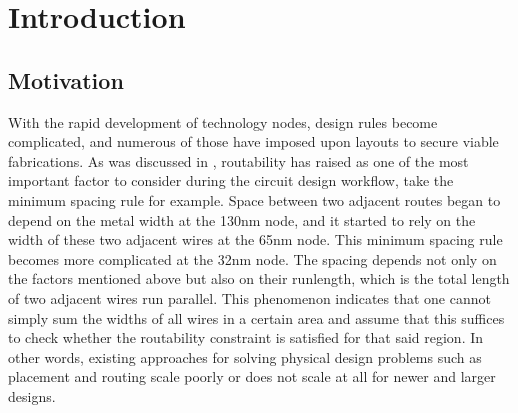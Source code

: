 \section{Introduction}
\label{sec:intro}
\subsection{Motivation}
With the rapid development of technology nodes, design rules become complicated, and numerous of those have imposed upon layouts to secure viable fabrications. As was discussed in \cite{theimportance}, routability has raised as one of the most important factor to consider during the circuit design workflow, take the minimum spacing rule for example. Space between two adjacent routes began to depend on the metal width at the 130nm node, and it started to rely on the width of these two adjacent wires at the 65nm node. This minimum spacing rule becomes more complicated at the 32nm node. The spacing depends not only on the factors mentioned above but also on their runlength, which is the total length of two adjacent wires run parallel. This phenomenon indicates that one cannot simply sum the widths of all wires in a certain area and assume that this suffices to check whether the routability constraint is satisfied for that said region. In other words, existing approaches for solving physical design problems such as placement and routing scale poorly or does not scale at all for newer and larger designs.


